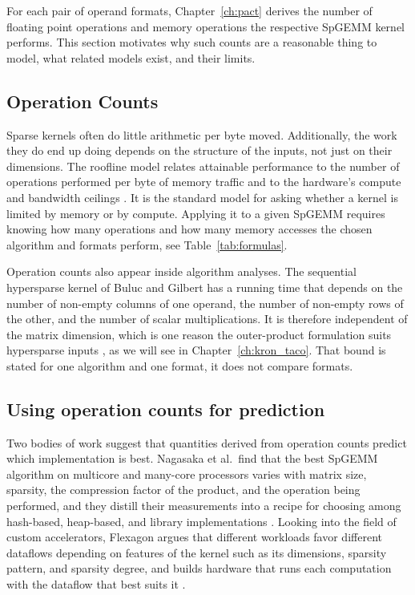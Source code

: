 For each pair of operand formats, Chapter~\ref{ch:pact} derives the number of floating point operations and memory operations the
respective SpGEMM kernel performs. This section motivates why such counts are a reasonable thing to model, what related models exist, and their limits.

\subsection{Operation Counts}
Sparse kernels often do little arithmetic per byte moved. Additionally, the work they do end up doing depends on the structure of the inputs,
not just on their dimensions. The roofline model relates attainable performance to the number of operations performed per byte of memory traffic and to
the hardware's compute and bandwidth ceilings \cite{roofline}. It is the standard model for asking whether a kernel is limited by memory or
by compute. Applying it to a given SpGEMM requires knowing how many operations and how many memory accesses the chosen algorithm and formats perform, see Table~\ref{tab:formulas}.

Operation counts also appear inside algorithm analyses. The sequential hypersparse kernel of Buluc and Gilbert has a running time that depends on the number of non-empty columns of one operand, the number of non-empty rows of the other, and the number of scalar multiplications. It is therefore independent of the matrix dimension, which is one reason the outer-product formulation suits hypersparse inputs \cite{bulucgilbert2010highly}, as we will see in Chapter~\ref{ch:kron_taco}. That bound is stated for one algorithm and one format, it does not compare formats.

\subsection{Using operation counts for prediction}
Two bodies of work suggest that quantities derived from operation counts predict which implementation is best. Nagasaka et al.\ find that the best SpGEMM algorithm on multicore and many-core processors varies with matrix size, sparsity, the compression factor of the product, and the operation being performed, and they distill their measurements into a recipe for choosing among hash-based, heap-based, and library implementations \cite{nagasaka2018highperformance}. Looking into the field of custom accelerators, Flexagon argues that different workloads favor different dataflows depending on features of the kernel such as its dimensions, sparsity pattern, and sparsity degree, and builds hardware that runs each computation with the dataflow that best suits it \cite{munoz2023flexagon}.

